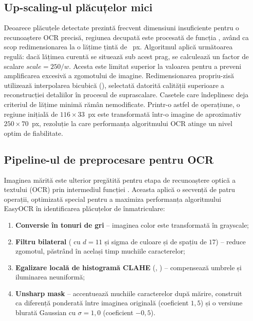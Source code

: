 \documentclass[../../main.tex]{subfiles}
\begin{document}
\subsection{Up-scaling-ul plăcuțelor mici}
\label{subsec:upscaling}

Deoarece plăcuțele detectate prezintă frecvent dimensiuni insuficiente pentru o recunoaștere OCR precisă, regiunea decupată este procesată de funcția \linebreak {}, având ca scop redimensionarea la o lățime țintă de ~px. Algoritmul aplică următoarea regulă: dacă lățimea curentă se situează sub acest prag, se calculează un factor de scalare $\mathit{scale} = 250 / w$. Acesta este limitat superior la valoarea  pentru a preveni amplificarea excesivă a zgomotului de imagine. Redimensionarea propriu-zisă utilizează interpolarea bicubică (), selectată datorită calității superioare a reconstrucției detaliilor în procesul de suprascalare. Casetele care îndeplinesc deja criteriul de lățime minimă rămân nemodificate. Printr-o astfel de operațiune, o regiune inițială de $116 \times 33$~px este transformată într-o imagine de aproximativ $250 \times 70$~px, rezoluție la care performanța algoritmului OCR atinge un nivel optim de fiabilitate.

\subsection{Pipeline-ul de preprocesare pentru OCR}
\label{subsec:preprocesare_ocr}

Imaginea mărită este ulterior pregătită pentru etapa de recunoaștere optică a textului (OCR) prin intermediul funcției . Aceasta aplică o secvență de patru operații, optimizată special pentru a maximiza performanța algoritmului EasyOCR în identificarea plăcuțelor de înmatriculare:

\begin{enumerate}
    \item \textbf{Conversie în tonuri de gri} -- imaginea color este transformată în \linebreak
    grayscale;
    \item \textbf{Filtru bilateral} ( cu $d=11$ și sigma de
    culoare și de spațiu de $17$) -- reduce zgomotul, păstrând în același timp muchiile
    caracterelor;
    \item \textbf{Egalizare locală de histogramă CLAHE} (,
     ) -- compensează umbrele și iluminarea neuniformă;
    \item \textbf{Unsharp mask} -- accentuează muchiile caracterelor după mărire, construit
    ca diferență ponderată între imaginea originală (coeficient $1{,}5$) și o versiune blurată
    Gaussian cu $\sigma = 1{,}0$ (coeficient $-0{,}5$).
\end{enumerate}
\end{document}
